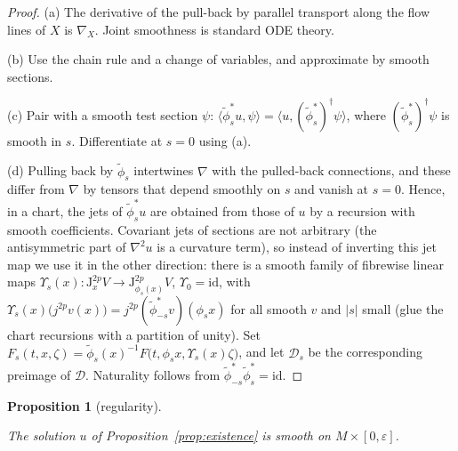 \documentclass[11pt,reqno]{amsart}
\newtheorem{proposition}[theorem]{Proposition}
\theoremstyle{definition}
\theoremstyle{remark}
\newcommand{\Dom}{\mathcal{D}}
\newcommand{\Jet}{\mathrm{J}}
\newcommand{\id}{\mathrm{id}}
\newcommand{\ip}[2]{\langle #1,#2\rangle}
\newcommand{\lean}[1]{}
\newcommand{\uses}[1]{}
\numberwithin{equation}{section}
\begin{document}
\begin{proof}
(a) The derivative of the pull-back by parallel transport along the flow lines of $X$ is $\nabla_X$.
Joint smoothness is standard ODE theory.

(b) Use the chain rule and a change of variables, and approximate by smooth sections.

(c) Pair with a smooth test section $\psi$:
$\ip{\tilde\phi_s^*u}{\psi}=\ip{u}{(\tilde\phi_s^*)^\dagger\psi}$, where
$(\tilde\phi_s^*)^\dagger\psi$ is smooth in $s$. Differentiate at $s=0$ using (a).

(d) Pulling back by $\tilde\phi_s$ intertwines $\nabla$ with the pulled-back connections, and these
differ from $\nabla$ by tensors that depend smoothly on $s$ and vanish at $s=0$. Hence, in a chart,
the jets of $\tilde\phi_s^*u$ are obtained from those of $u$ by a recursion with smooth coefficients.
Covariant jets of sections are not arbitrary (the antisymmetric part of $\nabla^2u$ is a curvature
term), so instead of inverting this jet map we use it in the other direction: there is a smooth family
of fibrewise linear maps $\Upsilon_s(x)\colon\Jet^{2p}_xV\to\Jet^{2p}_{\phi_s(x)}V$, $\Upsilon_0=\id$,
with $\Upsilon_s(x)\bigl(j^{2p}v(x)\bigr)=j^{2p}(\tilde\phi_{-s}^*v)(\phi_s x)$ for all smooth $v$ and
$|s|$ small (glue the chart recursions with a partition of unity). Set
$F_s(t,x,\zeta)=\tilde\phi_s(x)^{-1}F\bigl(t,\phi_s x,\Upsilon_s(x)\zeta\bigr)$, and let $\Dom_s$ be the
corresponding preimage of $\Dom$. Naturality follows from $\tilde\phi_{-s}^*\tilde\phi_s^*=\id$.
\end{proof}

\begin{proposition}[regularity]\label{prop:regularity}
\lean{ShortTime.EquationData.parabolicSpace_solution_smooth, ShortTime.SmoothRep.exists_smooth_rep, ShortTime.SmoothRep.exists_spatialSmooth, ShortTime.SpatialReg.contDiffOn_of_evolution, ShortTime.SmoothRep.evalJet_iterPullExt, ShortTime.Angenent.exists_contDiffAt_of_natural, ShortTime.HFlow.contDiff_iterPullExt_ofSmooth, ShortTime.EquationData.regularity_of_time, ShortTime.EquationData.smoothRep_time, ShortTime.EquationData.exists_iterPull_contDiffOn, ShortTime.Angenent.regularity_core}
\uses{prop:existence, def:solution}
The solution $u$ of Proposition~\ref{prop:existence} is smooth on $M\times[0,\varepsilon]$.
\end{proposition}
\end{document}
